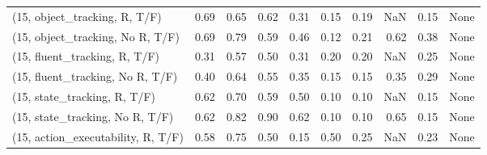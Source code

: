 \begin{table*}[h!]
\begin{adjustbox}{width=2\columnwidth,center}
\begin{tabular}{lrrr|rrr|rrr}
\midrule
(15, object\_tracking, R, T/F)         &                      0.69 &                  0.65 &                      0.62 &                          0.31 &                      0.15 &                          0.19 &                                    NaN &                               0.15 &                                  None \\
(15, object\_tracking, No R, T/F)      &                      0.69 &                  0.79 &                      0.59 &                          0.46 &                      0.12 &                          0.21 &                                   0.62 &                               0.38 &                                  None \\
(15, fluent\_tracking, R, T/F)         &                      0.31 &                  0.57 &                      0.50 &                          0.31 &                      0.20 &                          0.20 &                                    NaN &                               0.25 &                                  None \\
(15, fluent\_tracking, No R, T/F)      &                      0.40 &                  0.64 &                      0.55 &                          0.35 &                      0.15 &                          0.15 &                                   0.35 &                               0.29 &                                  None \\
(15, state\_tracking, R, T/F)          &                      0.62 &                  0.70 &                      0.59 &                          0.50 &                      0.10 &                          0.10 &                                    NaN &                               0.15 &                                  None \\
(15, state\_tracking, No R, T/F)       &                      0.62 &                  0.82 &                      0.90 &                          0.62 &                      0.10 &                          0.10 &                                   0.65 &                               0.15 &                                  None \\
(15, action\_executability, R, T/F)    &                      0.58 &                  0.75 &                      0.50 &                          0.15 &                      0.50 &                          0.25 &                                    NaN &                               0.23 &                                  None \\

\end{tabular}
\end{adjustbox}
\end{table*}
